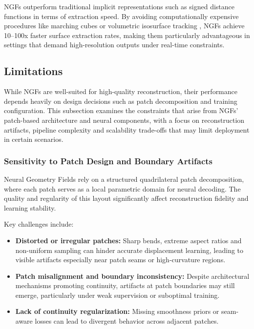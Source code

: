NGFs outperform traditional implicit representations such as signed distance functions in terms of extraction speed. 
By avoiding computationally expensive procedures like marching cubes or volumetric isosurface tracking \cite{mildenhall2020}, NGFs achieve 10--100x faster surface extraction rates, making them particularly advantageous in settings that demand high-resolution outputs under real-time constraints. 

\subsection{Limitations}

While NGFs are well-suited for high-quality reconstruction, their performance depends heavily on design decisions such as patch decomposition and training configuration. 
This subsection examines the constraints that arise from NGFs' patch-based architecture and neural components, with a focus on reconstruction artifacts, pipeline complexity and scalability trade-offs that may limit deployment in certain scenarios.

\subsubsection{Sensitivity to Patch Design and Boundary Artifacts}

Neural Geometry Fields rely on a structured quadrilateral patch decomposition, where each patch serves as a local parametric domain for neural decoding. 
The quality and regularity of this layout significantly affect reconstruction fidelity and learning stability. 

Key challenges include:
\begin{itemize}
    \item \textbf{Distorted or irregular patches:} Sharp bends, extreme aspect ratios and non-uniform sampling can hinder accurate displacement learning, leading to visible artifacts especially near patch seams or high-curvature regions.
    \item \textbf{Patch misalignment and boundary inconsistency:} Despite architectural mechanisms promoting continuity, artifacts at patch boundaries may still emerge, particularly under weak supervision or suboptimal training.
    \item \textbf{Lack of continuity regularization:} Missing smoothness priors or seam-aware losses can lead to divergent behavior across adjacent patches.
\end{itemize}

